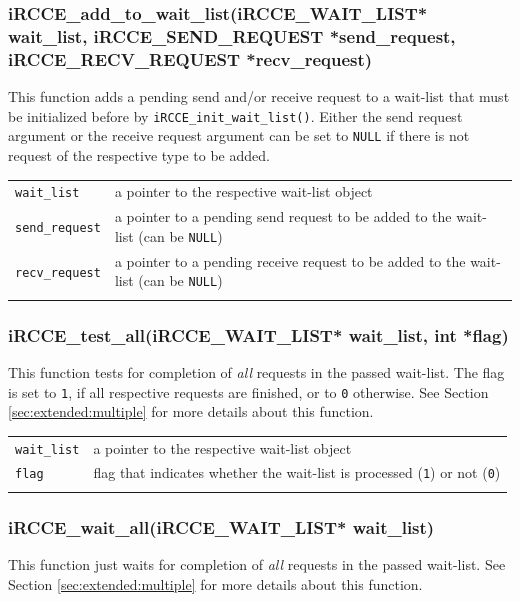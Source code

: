 \documentclass[fontsize=10pt, paper=a4, DIV12, pagesize=auto]{scrartcl}
\begin{document}
\subsubsection{iRCCE\_add\_to\_wait\_list(iRCCE\_WAIT\_LIST* wait\_list, iRCCE\_SEND\_REQUEST *send\_request, \\ 
\hspace{8.63cm} iRCCE\_RECV\_REQUEST *recv\_request)}\vspace{-0.3cm}
This function adds a pending send and/or receive request to a wait-list that must be initialized before by  \texttt{iRCCE\_init\_wait\_list()}.
Either the send request argument or the receive request argument can be set to \texttt{NULL} if there is not request of the respective type to be added.

\begin{tabular}{ll}
\texttt{wait\_list}     & a pointer to the respective wait-list object \\
\texttt{send\_request}  & a pointer to a pending send request to be added to the wait-list (can be \texttt{NULL}) \\
\texttt{recv\_request}  & a pointer to a pending receive request to be added to the wait-list (can be \texttt{NULL}) \\
\hspace{2.0cm}
\end{tabular}


\subsubsection{iRCCE\_test\_all(iRCCE\_WAIT\_LIST* wait\_list, int *flag)}\vspace{-0.3cm}
This function tests for completion of \emph{all} requests in the passed wait-list.
The flag is set to \texttt{1}, if all respective requests are finished, or to \texttt{0} otherwise.
See Section \ref{sec:extended:multiple} for more details about this function.

\begin{tabular}{ll}
\texttt{wait\_list} & a pointer to the respective wait-list object \\
\texttt{flag}       & flag that indicates whether the wait-list is processed (\texttt{1}) or not (\texttt{0})\\
\hspace{2.0cm}
\end{tabular}


\subsubsection{iRCCE\_wait\_all(iRCCE\_WAIT\_LIST* wait\_list)}\vspace{-0.3cm}
This function just waits for completion of \emph{all} requests in the passed wait-list.
See Section \ref{sec:extended:multiple} for more details about this function.
\end{document}
